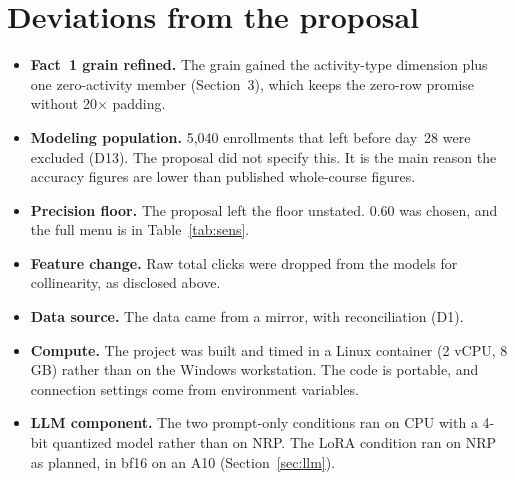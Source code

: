 \documentclass[10pt,letterpaper]{article}
\begin{document}
\section{Deviations from the proposal}
\begin{itemize}
\item \textbf{Fact~1 grain refined.} The grain gained the activity-type dimension plus one zero-activity member
(Section~3), which keeps the zero-row promise without 20$\times$ padding.
\item \textbf{Modeling population.} 5,040 enrollments that left before day~28 were excluded (D13). The proposal
did not specify this. It is the main reason the accuracy figures are lower than published whole-course figures.
\item \textbf{Precision floor.} The proposal left the floor unstated. 0.60 was chosen, and the full menu is in
Table~\ref{tab:sens}.
\item \textbf{Feature change.} Raw total clicks were dropped from the models for collinearity, as disclosed
above.
\item \textbf{Data source.} The data came from a mirror, with reconciliation (D1).
\item \textbf{Compute.} The project was built and timed in a Linux container (2 vCPU, 8 GB) rather than on the
Windows workstation. The code is portable, and connection settings come from environment variables.
\item \textbf{LLM component.} The two prompt-only conditions ran on CPU with a 4-bit quantized model rather
than on NRP. The LoRA condition ran on NRP as planned, in bf16 on an A10 (Section~\ref{sec:llm}).
\end{itemize}
\end{document}
